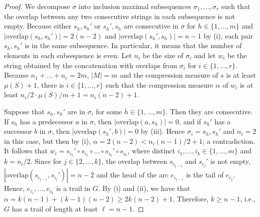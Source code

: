 \documentclass[11pt]{article}
\newcommand{\overlap}{\textrm{overlap}}
\begin{document}
\begin{proof}
We decompose $\sigma$ into inclusion maximal subsequences $\sigma_1,\ldots,\sigma_r$ such that the overlap between any two consecutive strings in each subsequence is not empty.
Because  either $s_h,s_h'$ or $s_h',s_h$ are consecutive in $\sigma$ for $h\in\{1,\ldots,m\}$ and  $|\overlap(s_h,s_h')|=2(n-2)$ and $|\overlap(s_h',s_h)|=n-1$ by (i), each pair $s_h,s_h'$ is in the same subsequence. In particular, it means that the number of elements in each subsequence is even. Let $n_i$ be the size of $\sigma_i$ and let $w_i$ be the string obtained by the concatenation with overlaps from $\sigma_i$ for $i\in\{1,\ldots,r\}$. Because $n_1+\ldots+n_r=2m$, $|M|=m$ and the compression measure of $s$ is at least $\mu(S)+1$, 
there is $i\in\{1,\ldots,r\}$ such that the compression measure $\alpha$ of $w_i$ is at least $n_i/2\cdot\mu(S)/m+1=n_i(n-2)+1$.

Suppose that $s_h,s_h'$ are in $\sigma_i$ for some $h\in\{1,\ldots,m\}$. Then they are consecutive. If $s_h$ has a predecessor $a$ in $\sigma$, then $|\overlap(a,s_h)|=0$, and if 
$s_h'$ has a successor $b$ in $\sigma$, then $|\overlap(s_h',b)|=0$ by (iii). Hence $\sigma_i=s_h,s_h'$ and $n_i=2$ in this case, but then by (i), $\alpha=2(n-2)<n_i(n-1)/2+1$; a contradiction. It follows that $w_i=s_{i_1}'\circ s_{i_1}\circ\ldots\circ  s_{i_k}'\circ s_{i_k}$, where distinct $i_1,\ldots,i_k\in\{1,\ldots,m\}$ and $k=n_i/2$. 
Since for $j\in\{2,\ldots,k\}$, the overlap between $s_{i_{j-1}}$ and $s_{i_j}'$ is not empty, $|\overlap(s_{i_{j-1}},s_{i_j}')|=n-2$ and the head of the arc $e_{i_{j-1}}$ is the tail of $e_{i_j}$.
Hence, $e_{i_1},\ldots,e_{i_k}$ is a  trail in $G$. By (i) and (ii), we have that $\alpha=k(n-1)+(k-1)(n-2)\geq 2k(n-2)+1$. Therefore, $k\geq n-1$, i.e., $G$ has a  trail of length at least $\ell=n-1$. 
\end{proof}







\end{document}
